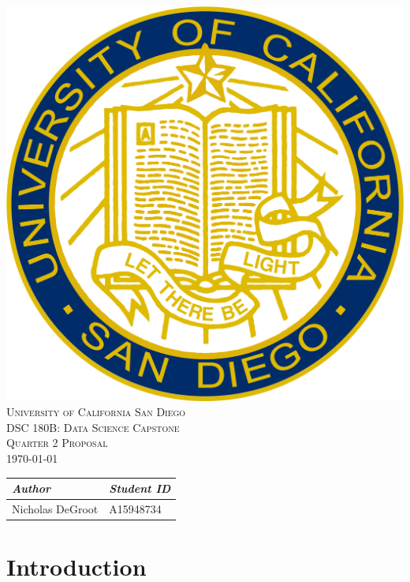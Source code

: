 \documentclass{common/ucsdreport}
\def\course{DSC 180B: Data Science Capstone}
\def\thetitle{Quarter 2 Proposal}
\def\date{\today}
\begin{document}
\begin{center}
    \vspace*{1.5cm}
    \includegraphics[scale = 0.10]{badges/ucsdseal.png}\\[1.75cm]
    \textsc{\color[RGB]{0, 51, 102}\LARGE{University of California San Diego}}\\[1cm]
    \textsc{\Large{\course}}\\[.5cm]
    \textsc{\Large{\thetitle}}\\[.5cm]
    \textsc{\date}\\[2cm]
    \Large{
        \begin{tabular}{L{4cm} R{4cm}}
            \textit{Author}  & \textit{Student ID} \\
            \hline
            Nicholas DeGroot & A15948734
        \end{tabular}
    }
\end{center}
\thispagestyle{empty}
\pagebreak

\tableofcontents{}
\pagebreak

\section{Introduction}
\end{document}
